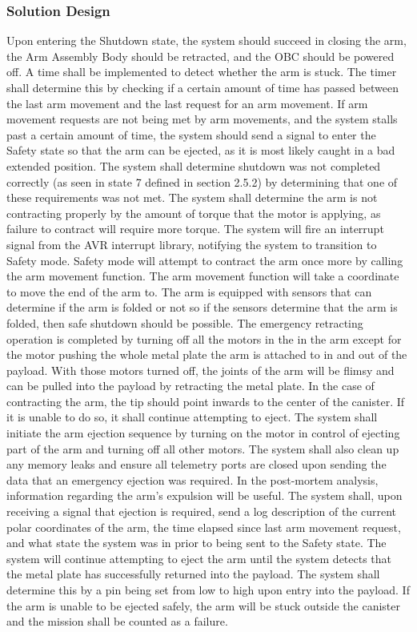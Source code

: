 \documentclass[letterpaper,10pt]{article}
\begin{document}
\subsubsection{Solution Design}
Upon entering the Shutdown state, the system should succeed in closing the arm, the Arm Assembly Body should be retracted, 
and the \gls{OBC} should be powered off. A time shall be implemented to detect whether the arm is stuck. The timer shall determine this by 
checking if a certain amount of time has passed between the last arm movement and the last request for an arm movement. 
If arm movement requests are not being met by arm movements, and the system stalls past a certain amount of time, the system should 
send a signal to enter the Safety state so that the arm can be ejected, as it is most likely caught in a bad extended position.
The system shall determine shutdown was not completed correctly (as seen in state 7 defined in section 2.5.2) by determining that one 
of these requirements was not met.
The system shall determine the arm is not contracting properly by the amount of torque that the motor is applying, as failure to 
contract will require more torque. The system will fire an interrupt signal from the AVR interrupt library, notifying the system to 
transition to Safety mode. 
Safety mode will attempt to contract the arm once more by calling the arm movement function. The arm movement function will take a 
coordinate to move the end of the arm to. The arm is equipped with sensors that can determine if the arm is folded or not
so if the sensors determine that the arm is folded, then safe shutdown should be possible.
The emergency retracting operation is completed by turning off all the motors in the 
in the arm except for the motor pushing the whole metal plate the arm is attached to in and out of the payload.
With those motors turned off, the joints of the arm will be flimsy and can be pulled into the payload by retracting the metal plate.
In the case of contracting the arm, the tip should point inwards to the center of the canister.
If it is unable to do so, it shall continue attempting to eject. 
The system shall initiate the arm ejection sequence by turning on the motor in control of ejecting part of the arm and turning off all
other motors. 
The system shall also clean up any memory leaks and ensure all telemetry ports are closed upon sending the data that an 
emergency ejection was required. In the post-mortem analysis, information regarding the arm's expulsion will be useful. The system
shall, upon receiving a signal that ejection is required, send a log description of the current polar coordinates of the arm, the time 
elapsed since last arm movement request, and what state the system was in prior to being sent to the Safety state. The system will 
continue attempting to eject the arm until the system detects that the metal plate has successfully returned into the payload. 
The system shall determine this by a pin being set from low to high upon entry into the payload. 
If the arm is unable to be ejected safely, the arm will be stuck outside the canister and the mission shall be counted
as a failure.
\end{document}

